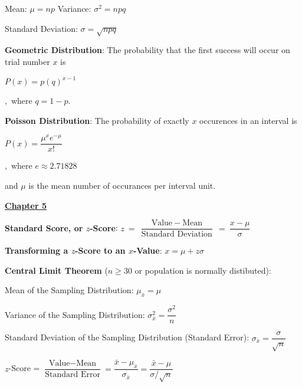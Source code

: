 \documentclass{article}
\begin{document}
\begin{large}
\hspace{0.1in} Mean: $\mu = np$ \hspace{0.25in} Variance: $\sigma^{2} = npq$

\hspace{0.1in} Standard Deviation: $\sigma = \sqrt{npq}$

\textbf{Geometric Distribution}: The probability that the first success will occur on trial number $x$ is 

\hspace{1.5in} \begin{Large}$P(x) = p(q)^{x-1}$\end{Large},\ where $q = 1 - p$.

\textbf{Poisson Distribution}: The probability of exactly $x$ occurences in an interval is 

\hspace{1.5in} \begin{Large}$P(x) = \dfrac{\mu^{x}e^{-\mu}}{x!}$\end{Large},\ where $e \approx 2.71828$ 

\hspace{0.1in} and $\mu$ is the mean number of occurances per interval unit.

\vspace{0.25in}

\underline{\textbf{\huge Chapter 5 \phantom{ } \phantom{ } \phantom{ } \phantom{ }}}

\textbf{Standard Score, or $z$-Score}: $z\ =\ \dfrac{\text{Value}\ -\ \text{Mean}}{\text{Standard Deviation}}\ =\ \dfrac{x - \mu}{\sigma}$

\textbf{Transforming a $z$-Score to an $x$-Value}: $x = \mu + z\sigma$

\textbf{Central Limit Theorem} ($n \geq 30$ or population is normally distibuted):

\hspace{0.1in} Mean of the Sampling Distribution: $\mu_{\bar{x}} = \mu$

\hspace{0.1in} Variance of the Sampling Distribution: $\sigma_{\bar{x}}^{2} = \dfrac{\sigma^{2}}{n}$

\hspace{0.1in} Standard Deviation of the Sampling Distribution (Standard Error): $\sigma_{\bar{x}} = \dfrac{\sigma}{\sqrt{n}}$

\hspace{0.1in} $z$-Score = $\dfrac{\text{Value} - \text{Mean}}{\text{Standard Error}} = \dfrac{\bar{x} - \mu_{\bar{x}}}{\sigma_{\bar{x}}} = \dfrac{\bar{x} - \mu}{\sigma / \sqrt{n}}$


\end{large}
\end{document}
